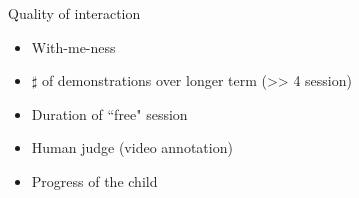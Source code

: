 \documentclass[compress]{beamer}
\begin{document}
\begin{frame}{Quality of interaction}
\begin{itemize}
\item With-me-ness
\item $\sharp$ of demonstrations over longer term (>> 4 session)
\item Duration of ``free" session
\item Human judge (video annotation)
\item Progress of the child
\end{itemize}
\end{frame}
\end{document}
